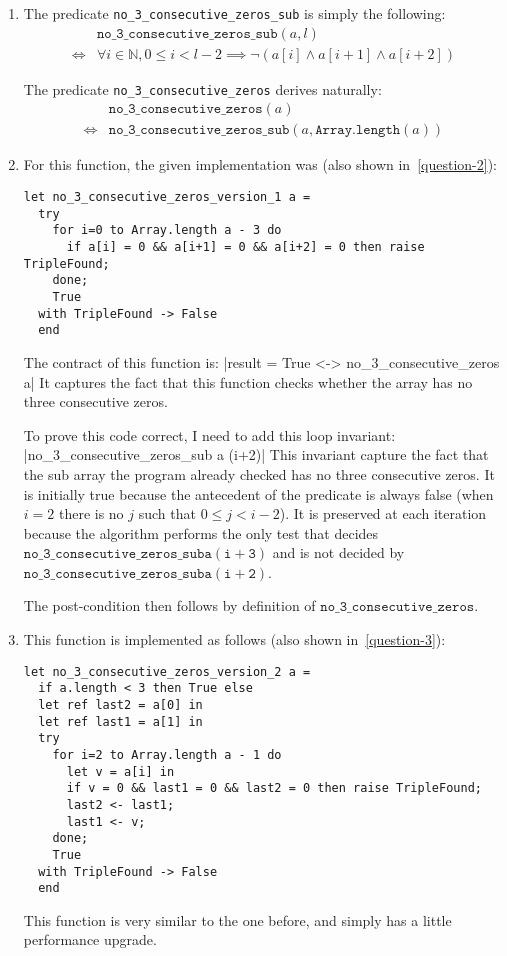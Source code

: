 \documentclass[a4paper]{article}
\begin{document}
\begin{enumerate}
\item The predicate \texttt{no\_3\_consecutive\_zeros\_sub} is simply the
  following:
  \begin{align*}
         & \mathtt{no\_3\_consecutive\_zeros\_sub}(a,l)\\
    \iff & \forall i\in\mathbb{N}, 0 \leq i < l-2 \implies \neg(a[i] \wedge a[i+1] \wedge a[i+2])
  \end{align*}

  The predicate \texttt{no\_3\_consecutive\_zeros} derives naturally:
  \begin{align*}
         & \mathtt{no\_3\_consecutive\_zeros}(a) \\
    \iff & \mathtt{no\_3\_consecutive\_zeros\_sub}\left(a, \mathtt{Array.length}(a)\right)
  \end{align*}

\item For this function, the given implementation was (also shown
  in~\ref{question-2}):
\begin{verbatim}
let no_3_consecutive_zeros_version_1 a =
  try
    for i=0 to Array.length a - 3 do
      if a[i] = 0 && a[i+1] = 0 && a[i+2] = 0 then raise TripleFound;
    done;
    True
  with TripleFound -> False
  end
\end{verbatim}
  The contract of this function is:
  |result = True <-> no_3_consecutive_zeros a|
  It captures the fact that this function checks whether the array has no three
  consecutive zeros.
  
  To prove this code  correct, I need to add this loop invariant:
  |no_3_consecutive_zeros_sub a (i+2)|
  This invariant capture the fact that the sub array the program already
  checked has no three consecutive zeros.
  It is initially true because the antecedent of the predicate is always false
  (when $i=2$ there is no $j$ such that $0 \leq j < i-2$).
  It is preserved at each iteration because the algorithm performs the only test
  that decides $\mathtt{no\_3\_consecutive\_zeros\_sub a (i+3)}$ and is not
  decided by $\mathtt{no\_3\_consecutive\_zeros\_sub a (i+2)}$.

  The post-condition then follows by definition of $\mathtt{no\_3\_consecutive\_zeros}$.


\item This function is implemented as follows (also shown in~\ref{question-3}):
\begin{verbatim}
let no_3_consecutive_zeros_version_2 a =
  if a.length < 3 then True else
  let ref last2 = a[0] in
  let ref last1 = a[1] in
  try
    for i=2 to Array.length a - 1 do
      let v = a[i] in
      if v = 0 && last1 = 0 && last2 = 0 then raise TripleFound;
      last2 <- last1;
      last1 <- v;
    done;
    True
  with TripleFound -> False
  end
\end{verbatim}
  This function is very similar to the one before, and simply has a little
  performance upgrade.


\end{enumerate}
\end{document}
